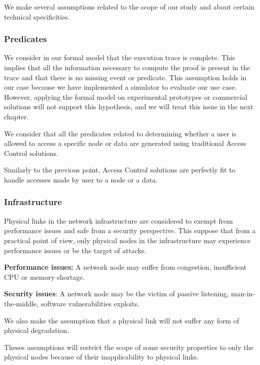 We make several assumptions related to the scope of our study and about certain technical specificities.

\subsubsection{Predicates}
We consider in our formal model that the execution trace is complete.
This implies that all the information necessary to compute the proof is present in the trace and that there is no missing event or predicate.
This assumption holds in our case because we have implemented a simulator to evaluate our use case. However, applying the formal model on experimental prototypes or commercial solutions will not support this hypothesis, and we will treat this issue in the next chapter.

We consider that all the predicates related to determining whether a user is allowed to access a specific node or data are generated using traditional Access Control solutions.

Similarly to the previous point, Access Control solutions are perfectly fit to handle accesses made by user to a node or a data.


\subsubsection{Infrastructure}
Physical links in the network infrastructure are considered to exempt from performance issues and safe from a security perspective.
This suppose that from a practical point of view, only physical nodes in the infrastructure may experience performance issues or be the target of attacks.

\textbf{Performance issues:} A network node may suffer from congestion, insufficient CPU or memory shortage. 

\textbf{Security issues}: A network node may be the victim of passive listening, man-in-the-middle, software vulnerabilities exploits.

We also make the assumption that a physical link will not suffer any form of physical degradation.

Theses assumptions will restrict the scope of some security properties to only the physical nodes because of their inapplicability to physical links.

